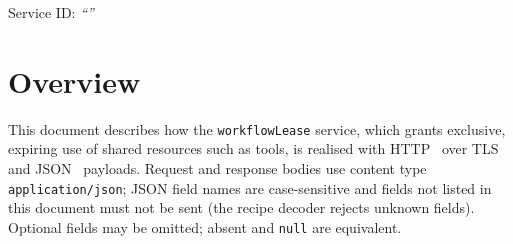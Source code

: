 \documentclass[a4paper]{arrowhead}
\begin{document}
\ArrowheadSetup

\begin{center}
  \vspace*{1cm}
  \huge{\arrowtitle}

  \vspace*{0.2cm}
  \LARGE{\arrowtype}
  \vspace*{1cm}

  \Large{Service ID: \textit{``\arrowid''}}
  \vspace*{\fill}

  

  \vspace*{1cm}
  \vspace*{\fill}

  \begin{abstract}
    This document describes the HTTP/TLS/JSON interface of the \texttt{workflowLease} service of the Eclipse Arrowhead workflow support systems, service version 1.0.0, documentation edition 5.4.0. It realises the abstract operations of the \texttt{workflowLease} SD.
  \end{abstract}

  \vspace*{1cm}
\end{center}

\newpage

\tableofcontents
\newpage

\section{Overview}
\label{sec:overview}
This document describes how the \texttt{workflowLease} service, which grants exclusive, expiring use of shared resources such as tools, is realised with HTTP~\cite{rfc9110}
over TLS~\cite{rfc8446} and JSON~\cite{rfc8259} payloads. Request and response bodies use content type
\texttt{application/\allowbreak{}json}; JSON field names are case-sensitive and fields not listed in this document must not be sent
(the recipe decoder rejects unknown fields). Optional fields may be omitted; absent and \texttt{null} are equivalent.
\end{document}
